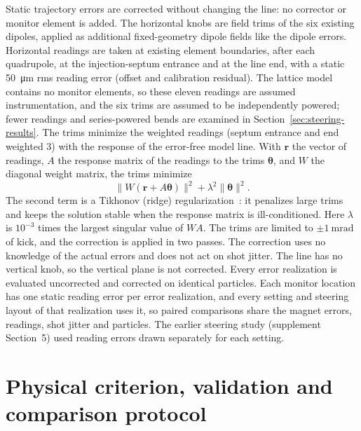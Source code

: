 \documentclass[final,5p,twocolumn]{elsarticle}
\begin{document}
Static trajectory errors are corrected without changing the line: no corrector or
monitor element is added. The horizontal knobs are field trims of the six existing
dipoles, applied as additional fixed-geometry
dipole fields like the dipole errors. Horizontal readings are taken at existing
element boundaries, after each quadrupole, at the injection-septum entrance and at
the line end, with a static \SI{50}{\micro\metre} rms reading error (offset and calibration
residual). The lattice model contains no monitor elements, so these eleven readings
are assumed instrumentation, and the six trims are assumed to be independently
powered; fewer readings and series-powered bends are examined in
Section~\ref{sec:steering-results}. The trims minimize the weighted readings (septum entrance and end weighted
3) with the response of the error-free model line. With $\mathbf r$ the vector of
readings, $A$ the response matrix of the readings to the trims $\boldsymbol\theta$,
and $W$ the diagonal weight matrix, the trims minimize
\begin{equation}
 \lVert W(\mathbf r+A\boldsymbol\theta)\rVert^2+\lambda^2\lVert\boldsymbol\theta\rVert^2 .
\end{equation}
The second term is a Tikhonov (ridge) regularization~\cite{Tikhonov1977}: it
penalizes large trims and keeps the solution stable when the response matrix is
ill-conditioned. Here $\lambda$ is $10^{-3}$ times the largest singular value of
$WA$. The trims are limited to $\pm\SI{1}{\milli\radian}$ of kick, and the
correction is applied in two passes. The correction uses no knowledge of the actual
errors and does not act on shot jitter. The line has no vertical knob, so the vertical
plane is not corrected. Every error realization is evaluated uncorrected and
corrected on identical particles. Each monitor location has one static reading
error per error realization, and every setting and steering layout of that
realization uses it, so paired comparisons share the magnet errors, readings, shot
jitter and particles. The earlier steering study (supplement Section~5) used reading errors drawn
separately for each setting.

\section{Physical criterion, validation and comparison protocol}\label{sec:methods}
\end{document}
